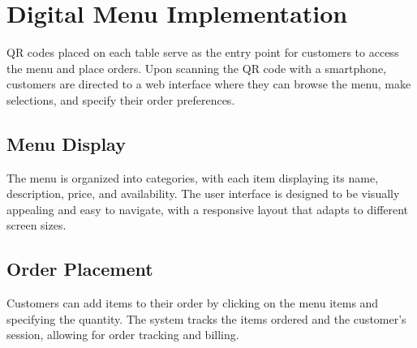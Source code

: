 
\section {Digital Menu Implementation}
QR codes placed on each table serve as the entry point for customers to access the menu and place orders. Upon scanning the QR code with a smartphone, customers are directed to a web interface where they can browse the menu, make selections, and specify their order preferences.
\subsection{Menu Display}
The menu is organized into categories, with each item displaying its name, description, price, and availability. The user interface is designed to be visually appealing and easy to navigate, with a responsive layout that adapts to different screen sizes.
\subsection{Order Placement}
Customers can add items to their order by clicking on the menu items and specifying the quantity. The system tracks the items ordered and the customer's session, allowing for order tracking and billing.
